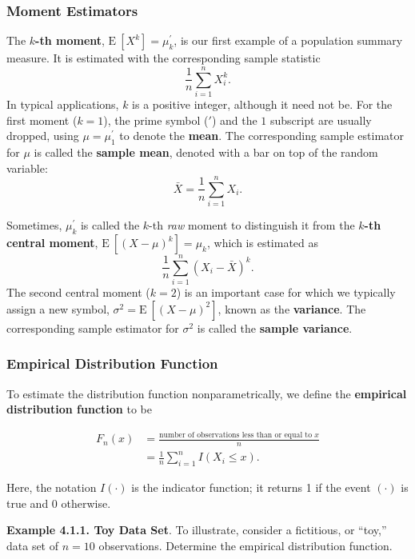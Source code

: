 \documentclass[]{book}
\theoremstyle{definition}
\theoremstyle{definition}
\theoremstyle{definition}
\theoremstyle{remark}
\begin{document}
\subsubsection{Moment Estimators}\label{S:MS:MomentEstimator}

The \(k\)\textbf{-th moment}, \(\mathrm{E~}[X^k] = \mu^{\prime}_k\), is
our first example of a population summary measure. It is estimated with
the corresponding sample statistic \[\frac{1}{n} \sum_{i=1}^n X_i^k .\]
In typical applications, \(k\) is a positive integer, although it need
not be. For the first moment (\(k=1\)), the prime symbol (\(\prime\))
and the \(1\) subscript are usually dropped, using
\(\mu=\mu^{\prime}_1\) to denote the \textbf{mean}. The corresponding
sample estimator for \(\mu\) is called the \textbf{sample mean}, denoted
with a bar on top of the random variable:
\[\bar{X} =\frac{1}{n} \sum_{i=1}^n X_i .\]

Sometimes, \(\mu^{\prime}_k\) is called the \(k\)-th \emph{raw} moment
to distinguish it from the \(k\)\textbf{-th central moment},
\(\mathrm{E~} [(X-\mu)^k] = \mu_k\), which is estimated as
\[\frac{1}{n} \sum_{i=1}^n \left(X_i - \bar{X}\right)^k .\] The second
central moment (\(k=2\)) is an important case for which we typically
assign a new symbol, \(\sigma^2 = \mathrm{E~} [(X-\mu)^2]\), known as
the \textbf{variance}. The corresponding sample estimator for
\(\sigma^2\) is called the \textbf{sample variance}.

\subsubsection{Empirical Distribution
Function}\label{empirical-distribution-function}

To estimate the distribution function nonparametrically, we define the
\textbf{empirical distribution function} to be

\[\begin{aligned}
F_n(x) &=  \frac{\text{number of observations less than or equal to }x}{n} \\
&=  \frac{1}{n} \sum_{i=1}^n I\left(X_i \le x\right).
\end{aligned}\]

Here, the notation \(I(\cdot)\) is the indicator function; it returns 1
if the event \((\cdot)\) is true and 0 otherwise.

\textbf{Example 4.1.1. Toy Data Set}. To illustrate, consider a
fictitious, or ``toy,'' data set of \(n=10\) observations. Determine the
empirical distribution function.
\end{document}
